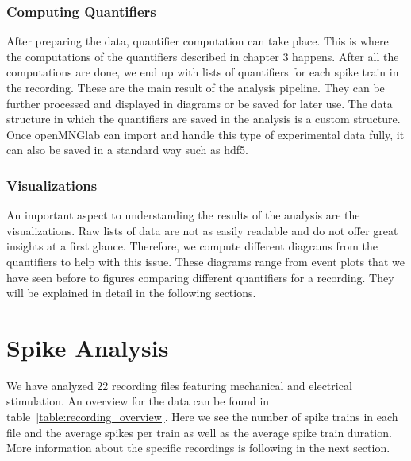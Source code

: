 \subsubsection{Computing Quantifiers}
After preparing the data, quantifier computation can take place. This is where the computations of the quantifiers described in chapter 3 happens. After all the computations are done, we end up with lists of quantifiers for each spike train in the recording. These are the main result of the analysis pipeline. They can be further processed and displayed in diagrams or be saved for later use. The data structure in which the quantifiers are saved in the analysis is a custom structure. Once openMNGlab can import and handle this type of experimental data fully, it can also be saved in a standard way such as hdf5.

\subsubsection{Visualizations}
An important aspect to understanding the results of the analysis are the visualizations. Raw lists of data are not as easily readable and do not offer great insights at a first glance. Therefore, we compute different diagrams from the quantifiers to help with this issue. These diagrams range from event plots that we have seen before to figures comparing different quantifiers for a recording. They will be explained in detail in the following sections.

\section{Spike Analysis}
We have analyzed 22 recording files featuring mechanical and electrical stimulation. An overview for the data can be found in table~\ref{table:recording_overview}. Here we see the number of spike trains in each file and the average spikes per train as well as the average spike train duration. More information about the specific recordings is following in the next section.

